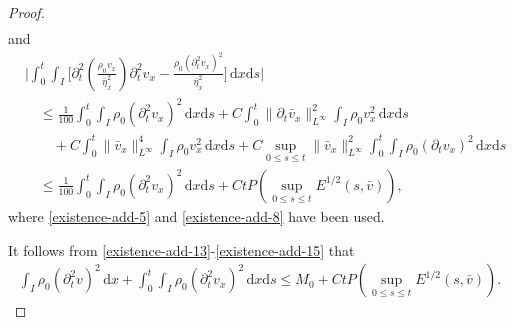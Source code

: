 \documentclass[11pt, reqno]{amsart}
\newcommand{\diff}{\mathrm{d}}
\numberwithin{equation}{section}
\begin{document}
{\begin{proof}
\begin{equation}
\begin{aligned}
\end{aligned}
\end{equation}
and
\begin{equation}\label{existence-add-15}
\begin{aligned}
&\bigg|\int_0^t\int_I\bigg[\partial_t^2(\frac{\rho_0v_x}{\bar{\eta}_x^2})\partial_t^2v_x
-{\frac{\rho_0(\partial_t^2v_x)^2}{\bar{\eta}_x^2}}\bigg]\,\diff x\diff s\bigg|\\
&\quad\leq \frac{1}{100}\int_0^t\int_I\rho_0(\partial_t^2v_x)^2\,\diff x\diff s
+C\int_0^t\|\partial_t\bar{v}_x\|_{L^\infty}^2\int_I\rho_0v_x^2\,\diff x\diff s\\
&\quad\quad+C\int_0^t\|\bar{v}_x\|_{L^\infty}^4\int_I\rho_0v_x^2\,\diff x\diff s
+C\sup_{0\leq s\leq t}\|\bar{v}_x\|_{L^\infty}^2\int_0^t\int_I\rho_0(\partial_tv_x)^2\,\diff x\diff s\\
&\quad\leq \frac{1}{100}\int_0^t\int_I\rho_0(\partial_t^2v_x)^2\,\diff x\diff s+Ct P(\sup_{0\leq s\leq t}E^{1/2}(s,\bar{v})),
\end{aligned}
\end{equation}
where \eqref{existence-add-5} and \eqref{existence-add-8} have been used. 

It follows from \eqref{existence-add-13}-\eqref{existence-add-15} that
\begin{equation}\label{existence-add-16}
\begin{aligned}
\int_I \rho_0(\partial_t^2v)^2\,\diff x
+\int_0^t\int_I\rho_0(\partial_t^2v_x)^2\,\diff x\diff s
\leq M_0+Ct P(\sup_{0\leq s\leq t}E^{1/2}(s,\bar{v})).
\end{aligned}
\end{equation}





\end{proof}}
\end{document}
